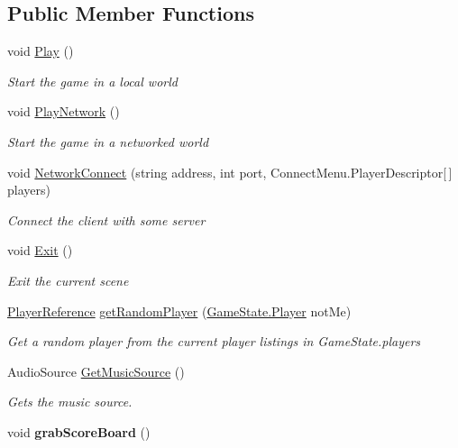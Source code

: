 \subsection*{Public Member Functions}
\begin{DoxyCompactItemize}
\item 
void \hyperlink{class_game_manager_a3403831c40f16191e3997be60d95380b}{Play} ()
\begin{DoxyCompactList}\small\item\em Start the game in a local world \end{DoxyCompactList}\item 
void \hyperlink{class_game_manager_a1138f86278583414cba9456d02d0fa1c}{Play\-Network} ()
\begin{DoxyCompactList}\small\item\em Start the game in a networked world \end{DoxyCompactList}\item 
void \hyperlink{class_game_manager_a3c3a8e05664851d7642c13989af691cf}{Network\-Connect} (string address, int port, Connect\-Menu.\-Player\-Descriptor\mbox{[}$\,$\mbox{]} players)
\begin{DoxyCompactList}\small\item\em Connect the client with some server \end{DoxyCompactList}\item 
void \hyperlink{class_game_manager_a5d9cafdd495a4ed2760de13b7b9c80b6}{Exit} ()
\begin{DoxyCompactList}\small\item\em Exit the current scene \end{DoxyCompactList}\item 
\hyperlink{class_player_reference}{Player\-Reference} \hyperlink{class_game_manager_aadd5e389068b81b09036cc2bb8c097d6}{get\-Random\-Player} (\hyperlink{struct_game_state_1_1_player}{Game\-State.\-Player} not\-Me)
\begin{DoxyCompactList}\small\item\em Get a random player from the current player listings in Game\-State.\-players \end{DoxyCompactList}\item 
Audio\-Source \hyperlink{class_game_manager_abf59d5ce551af5e35529f71a99d89d76}{Get\-Music\-Source} ()
\begin{DoxyCompactList}\small\item\em Gets the music source. \end{DoxyCompactList}\item 
\hypertarget{class_game_manager_a414dcfd0d1f5a5904d2440165e42923d}{void {\bfseries grab\-Score\-Board} ()}\label{class_game_manager_a414dcfd0d1f5a5904d2440165e42923d}

\end{DoxyCompactItemize}
